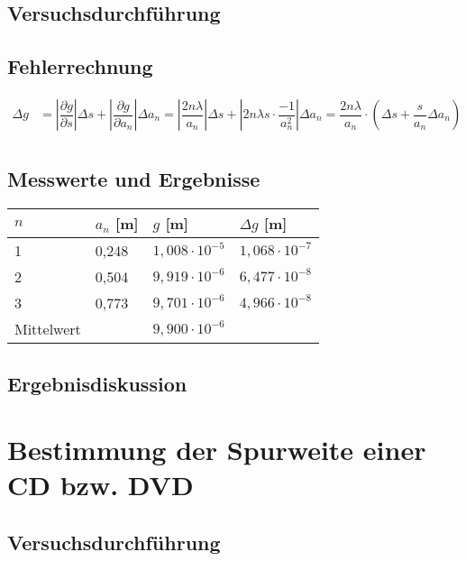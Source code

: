 \documentclass{scrartcl}
\begin{document}
\subsection{Versuchsdurchführung}
\subsection{Fehlerrechnung}
\begin{align*}
\Delta g & = \left| \dfrac{\partial g}{\partial s} \right| \Delta s + \left| \dfrac{\partial g}{\partial a_{n}} \right| \Delta a_{n} = \left| \dfrac{2n \lambda}{a_{n}} \right| \Delta s + \left| 2n \lambda s \cdot \dfrac{-1}{a_{n}^{2}} \right| \Delta a_{n} = \dfrac{2n \lambda}{a_{n}} \cdot (\Delta s + \dfrac{s}{a_{n}} \Delta a_{n})\\
\end{align*}
\subsection{Messwerte und Ergebnisse}
\begin{table}[H]
\begin{center}
\begin{tabular}{l|l|l|l}
$n$    & $a_{n}$ {[}m{]} & $g$ {[}m{]} & $\Delta g$ {[}m{]}\\
\hline
1          & 0,248       & $1,008 \cdot 10^{-5}$ & $1,068 \cdot 10^{-7}$ \\
2          & 0,504       & $9,919 \cdot 10^{-6}$ & $6,477 \cdot 10^{-8}$ \\
3          & 0,773       & $9,701 \cdot 10^{-6}$ & $4,966 \cdot 10^{-8}$ \\
Mittelwert &             & $9,900 \cdot 10^{-6}$ &
\end{tabular}
\end{center}
\label{tab:Wasser}
\end{table}
\subsection{Ergebnisdiskussion}

\section{Bestimmung der Spurweite einer CD bzw. DVD}
\subsection{Versuchsdurchführung}
\end{document}
